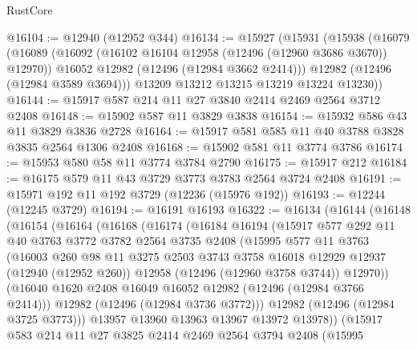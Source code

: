 \begin{lexlean}{RustCore}
\begin{coremodule}
@16104 := @12940 (@12952 @344)
@16134 := @15927
    (@15931
      (@15938
        (@16079
          (@16089
            (@16092 (@16102 @16104 @12958 (@12496 (@12960 @3686 @3670)) @12970))
            @16052
            @12982
            (@12496 (@12984 @3662 @2414)))
          @12982
          (@12496 (@12984 @3589 @3694)))
        @13209
        @13212
        @13215
        @13219
        @13224
        @13230))
@16144 := @15917 @587 @214 @11 @27 @3840 @2414 @2469 @2564 @3712 @2408
@16148 := @15902 @587 @11 @3829 @3838
@16154 := @15932 @586 @43 @11 @3829 @3836 @2728
@16164 := @15917 @581 @585 @11 @40 @3788 @3828 @3835 @2564 @1306 @2408
@16168 := @15902 @581 @11 @3774 @3786
@16174 := @15953 @580 @58 @11 @3774 @3784 @2790
@16175 := @15917 @212
@16184 := @16175 @579 @11 @43 @3729 @3773 @3783 @2564 @3724 @2408
@16191 := @15971 @192 @11 @192 @3729 (@12236 (@15976 @192))
@16193 := @12244 (@12245 @3729)
@16194 := @16191 @16193
@16322 := @16134
    (@16144
      (@16148
        (@16154
          (@16164
            (@16168
              (@16174
                (@16184
                  @16194
                  (@15917
                    @577
                    @292
                    @11
                    @40
                    @3763
                    @3772
                    @3782
                    @2564
                    @3735
                    @2408
                    (@15995
                      @577
                      @11
                      @3763
                      (@16003
                        @260
                        @98
                        @11
                        @3275
                        @2503
                        @3743
                        @3758
                        @16018
                        @12929
                        @12937
                        (@12940 (@12952 @260))
                        @12958
                        (@12496 (@12960 @3758 @3744))
                        @12970))
                    (@16040 @1620 @2408 @16049 @16052 @12982 (@12496 (@12984 @3766 @2414)))
                    @12982
                    (@12496 (@12984 @3736 @3772)))
                  @12982
                  (@12496 (@12984 @3725 @3773)))
                @13957
                @13960
                @13963
                @13967
                @13972
                @13978))
            (@15917
              @583
              @214
              @11
              @27
              @3825
              @2414
              @2469
              @2564
              @3794
              @2408
              (@15995

\end{coremodule}
\end{lexlean}

